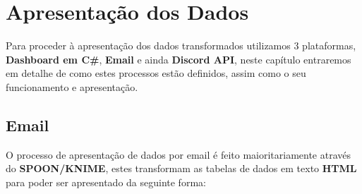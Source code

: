 \chapter{Apresentação dos Dados}

Para proceder à apresentação dos dados transformados utilizamos 3 plataformas, \textbf{Dashboard em C\#},
\textbf{Email} e ainda \textbf{Discord API}, neste capítulo entraremos em detalhe de como estes processos
estão definidos, assim como o seu funcionamento e apresentação.

\section*{Email}

O processo de apresentação de dados por email é feito maioritariamente através do \textbf{SPOON/KNIME}, estes transformam as tabelas de dados em texto \textbf{HTML} para poder ser apresentado da seguinte forma:

